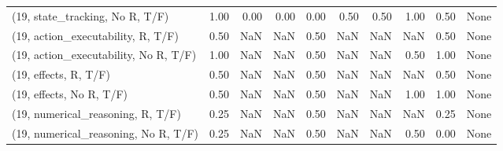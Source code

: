 \begin{table*}[h!]
\begin{adjustbox}{width=2\columnwidth,center}
\begin{tabular}{lrrr|rrr|rrr}
(19, state\_tracking, No R, T/F)       &                      1.00 &                  0.00 &                      0.00 &                          0.00 &                      0.50 &                          0.50 &                                   1.00 &                               0.50 &                                  None \\
(19, action\_executability, R, T/F)    &                      0.50 &                   NaN &                       NaN &                          0.50 &                       NaN &                           NaN &                                    NaN &                               0.50 &                                  None \\
(19, action\_executability, No R, T/F) &                      1.00 &                   NaN &                       NaN &                          0.50 &                       NaN &                           NaN &                                   0.50 &                               1.00 &                                  None \\
(19, effects, R, T/F)                 &                      0.50 &                   NaN &                       NaN &                          0.50 &                       NaN &                           NaN &                                    NaN &                               0.50 &                                  None \\
(19, effects, No R, T/F)              &                      0.50 &                   NaN &                       NaN &                          0.50 &                       NaN &                           NaN &                                   1.00 &                               1.00 &                                  None \\
(19, numerical\_reasoning, R, T/F)     &                      0.25 &                   NaN &                       NaN &                          0.50 &                       NaN &                           NaN &                                    NaN &                               0.25 &                                  None \\
(19, numerical\_reasoning, No R, T/F)  &                      0.25 &                   NaN &                       NaN &                          0.50 &                       NaN &                           NaN &                                   0.50 &                               0.00 &                                  None \\

\end{tabular}
\end{adjustbox}
\end{table*}
